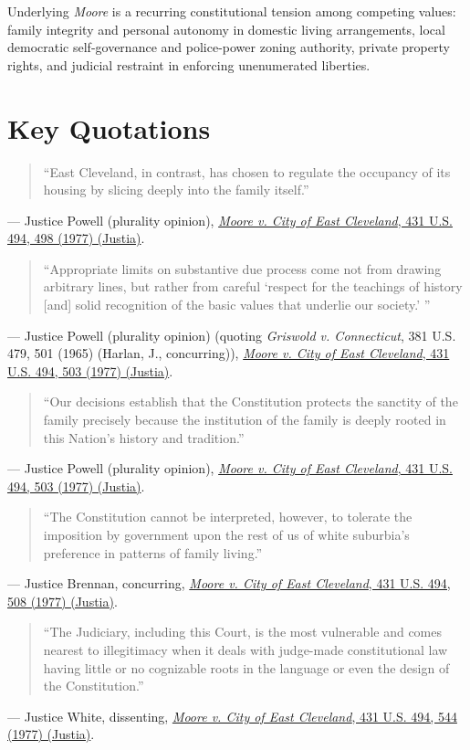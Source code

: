 \documentclass[12pt]{article}
\begin{document}
Underlying \textit{Moore} is a recurring constitutional tension among competing values: family integrity and personal autonomy in domestic living arrangements, local democratic self-governance and police-power zoning authority, private property rights, and judicial restraint in enforcing unenumerated liberties.

\section{Key Quotations}
\begin{quote}
``East Cleveland, in contrast, has chosen to regulate the occupancy of its housing by slicing deeply into the family itself.''
\end{quote}
\noindent --- Justice Powell (plurality opinion), \href{https://supreme.justia.com/cases/federal/us/431/494/}{\textit{Moore v. City of East Cleveland}, 431 U.S. 494, 498 (1977) (Justia)}.

\begin{quote}
``Appropriate limits on substantive due process come not from drawing arbitrary lines, but rather from careful `respect for the teachings of history [and] solid recognition of the basic values that underlie our society.' ''
\end{quote}
\noindent --- Justice Powell (plurality opinion) (quoting \textit{Griswold v. Connecticut}, 381 U.S. 479, 501 (1965) (Harlan, J., concurring)), \href{https://supreme.justia.com/cases/federal/us/431/494/}{\textit{Moore v. City of East Cleveland}, 431 U.S. 494, 503 (1977) (Justia)}.

\begin{quote}
``Our decisions establish that the Constitution protects the sanctity of the family precisely because the institution of the family is deeply rooted in this Nation's history and tradition.''
\end{quote}
\noindent --- Justice Powell (plurality opinion), \href{https://supreme.justia.com/cases/federal/us/431/494/}{\textit{Moore v. City of East Cleveland}, 431 U.S. 494, 503 (1977) (Justia)}.

\begin{quote}
``The Constitution cannot be interpreted, however, to tolerate the imposition by government upon the rest of us of white suburbia's preference in patterns of family living.''
\end{quote}
\noindent --- Justice Brennan, concurring, \href{https://supreme.justia.com/cases/federal/us/431/494/}{\textit{Moore v. City of East Cleveland}, 431 U.S. 494, 508 (1977) (Justia)}.

\begin{quote}
``The Judiciary, including this Court, is the most vulnerable and comes nearest to illegitimacy when it deals with judge-made constitutional law having little or no cognizable roots in the language or even the design of the Constitution.''
\end{quote}
\noindent --- Justice White, dissenting, \href{https://supreme.justia.com/cases/federal/us/431/494/}{\textit{Moore v. City of East Cleveland}, 431 U.S. 494, 544 (1977) (Justia)}.
\end{document}
